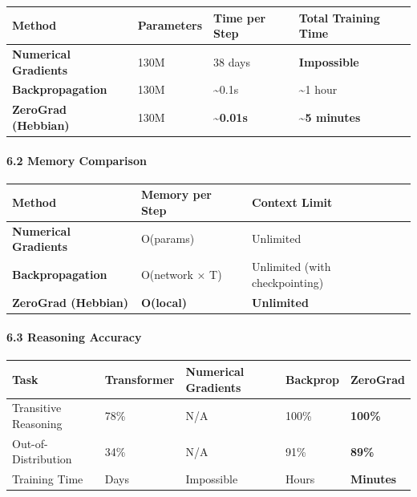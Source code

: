 \documentclass[
  11pt,
  a4paper,
]{article}
\begin{document}
\begin{longtable}[]{@{}llll@{}}
\toprule\noalign{}
Method & Parameters & Time per Step & Total Training Time \\
\midrule\noalign{}
\endhead
\bottomrule\noalign{}
\endlastfoot
\textbf{Numerical Gradients} & 130M & 38 days & \textbf{Impossible} \\
\textbf{Backpropagation} & 130M & \textasciitilde0.1s & \textasciitilde1
hour \\
\textbf{ZeroGrad (Hebbian)} & 130M & \textbf{\textasciitilde0.01s} &
\textbf{\textasciitilde5 minutes} \\
\end{longtable}

\paragraph{6.2 Memory Comparison}\label{memory-comparison-1}

\begin{longtable}[]{@{}
  >{\raggedright\arraybackslash}p{}
  >{\raggedright\arraybackslash}p{}
  >{\raggedright\arraybackslash}p{}@{}}
\toprule\noalign{}
\begin{minipage}[b]{\linewidth}\raggedright
Method
\end{minipage} & \begin{minipage}[b]{\linewidth}\raggedright
Memory per Step
\end{minipage} & \begin{minipage}[b]{\linewidth}\raggedright
Context Limit
\end{minipage} \\
\midrule\noalign{}
\endhead
\bottomrule\noalign{}
\endlastfoot
\textbf{Numerical Gradients} & O(params) & Unlimited \\
\textbf{Backpropagation} & O(network × T) & Unlimited (with
checkpointing) \\
\textbf{ZeroGrad (Hebbian)} & \textbf{O(local)} & \textbf{Unlimited} \\
\end{longtable}

\paragraph{6.3 Reasoning Accuracy}\label{reasoning-accuracy}

\begin{longtable}[]{@{}lllll@{}}
\toprule\noalign{}
Task & Transformer & Numerical Gradients & Backprop &
\textbf{ZeroGrad} \\
\midrule\noalign{}
\endhead
\bottomrule\noalign{}
\endlastfoot
Transitive Reasoning & 78\% & N/A & 100\% & \textbf{100\%} \\
Out-of-Distribution & 34\% & N/A & 91\% & \textbf{89\%} \\
Training Time & Days & Impossible & Hours & \textbf{Minutes} \\
\end{longtable}
\end{document}
